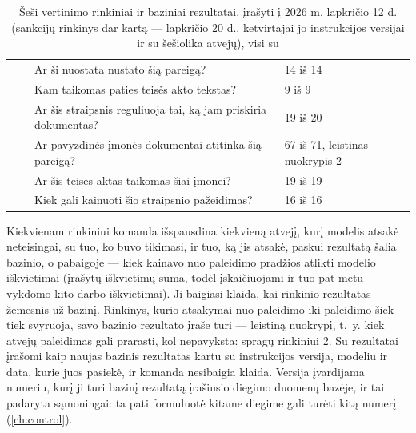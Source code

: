 \begin{table}[H]
\caption{Šeši  vertinimo rinkiniai ir baziniai rezultatai, įrašyti į
 2026 m. lapkričio 12 d. (sankcijų rinkinys dar kartą ---
lapkričio 20 d., ketvirtajai jo instrukcijos versijai ir su šešiolika atvejų), visi su
}\label{tab:ops:suites}
\begin{tabularx}{\textwidth}{@{}L{22mm}L{47mm}YL{22mm}@{}}
\toprule
{} &  &  &  \\
\midrule
{} &  & Ar ši nuostata nustato šią pareigą? & 14 iš 14 \\
 &  & Kam taikomas paties teisės akto tekstas? & 9 iš 9 \\
 &  & Ar šis straipsnis reguliuoja tai, ką jam priskiria dokumentas? & 19 iš 20 \\
 &  & Ar pavyzdinės įmonės dokumentai atitinka šią pareigą? & 67 iš 71, leistinas nuokrypis 2 \\
 &  & Ar šis teisės aktas taikomas šiai įmonei? & 19 iš 19 \\
 &  & Kiek gali kainuoti šio straipsnio pažeidimas? & 16 iš 16 \\
\bottomrule
\end{tabularx}
\end{table}

Kiekvienam rinkiniui komanda išspausdina kiekvieną atvejį, kurį modelis atsakė neteisingai, su
tuo, ko buvo tikimasi, ir tuo, ką jis atsakė, paskui rezultatą šalia bazinio, o pabaigoje --- kiek
kainavo nuo paleidimo pradžios atlikti modelio iškvietimai (įrašytų iškvietimų suma, todėl
įskaičiuojami ir tuo pat metu vykdomo kito darbo iškvietimai). Ji baigiasi klaida, kai rinkinio
rezultatas žemesnis už bazinį. Rinkinys, kurio atsakymai nuo paleidimo iki paleidimo šiek tiek
svyruoja, savo bazinio rezultato įraše turi  --- leistiną nuokrypį, t.~y. kiek atvejų
paleidimas gali prarasti, kol nepavyksta: spragų rinkiniui 2. Su  rezultatai
įrašomi kaip naujas bazinis rezultatas kartu su instrukcijos versija, modeliu ir data, kurie juos
pasiekė, ir komanda nesibaigia klaida. Versija įvardijama numeriu, kurį ji turi bazinį rezultatą
įrašiusio diegimo duomenų bazėje, ir tai padaryta sąmoningai: ta pati formuluotė kitame diegime
gali turėti kitą numerį (\cref{ch:control}).

